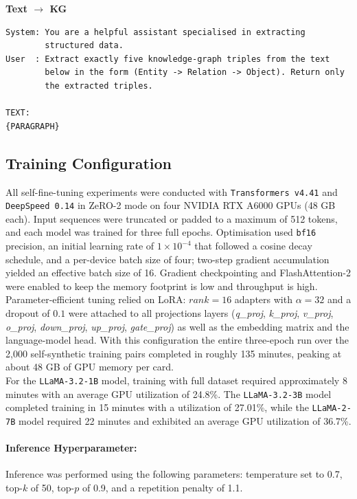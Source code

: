 \documentclass[11pt]{article}
\begin{document}
\noindent\textbf{Text $\rightarrow$ KG}
\begin{lstlisting}[style=prompt]
System: You are a helpful assistant specialised in extracting
        structured data.
User  : Extract exactly five knowledge-graph triples from the text
        below in the form (Entity -> Relation -> Object). Return only
        the extracted triples.

TEXT:
{PARAGRAPH}
\end{lstlisting}


\subsection{Training Configuration}
\label{ssec:training}

All self-fine-tuning experiments were conducted with
\texttt{Transformers v4.41} and \texttt{DeepSpeed 0.14} in ZeRO-2
mode on four NVIDIA RTX A6000 GPUs (48 GB each).
Input sequences were truncated or padded to a maximum of 512 tokens,
and each model was trained for three full epochs.
Optimisation used \texttt{bf16} precision, an initial learning rate of
\(1\times10^{-4}\) that followed a cosine decay schedule, and a
per-device batch size of four; two-step gradient accumulation yielded
an effective batch size of 16.
Gradient checkpointing and FlashAttention-2 were enabled to keep the
memory footprint is low and throughput is high.
Parameter-efficient tuning relied on LoRA: $rank=16$ adapters with
\(\alpha=32\) and a dropout of $0.1$ were attached to all projections
layers (\textit{q\_proj}, \textit{k\_proj}, \textit{v\_proj},
\textit{o\_proj}, \textit{down\_proj}, \textit{up\_proj},
\textit{gate\_proj}) as well as the embedding matrix and the language-model head.
With this configuration the entire three-epoch run over the 2,000
self-synthetic training pairs completed in roughly 135 minutes,
peaking at about 48 GB of GPU memory per card.\\
 For the \texttt{LLaMA-3.2-1B} model, training with full dataset required approximately 8 minutes with an average GPU utilization of 24.8\%. The \texttt{LLaMA-3.2-3B} model completed training in 15 minutes with a utilization of 27.01\%, while the \texttt{LLaMA-2-7B} model required 22 minutes and exhibited an average GPU utilization of 36.7\%. 
\paragraph{Inference Hyperparameter:}
Inference was performed using the following parameters: temperature set to 0.7, top-$k$ of 50, top-$p$ of 0.9, and a repetition penalty of 1.1.
\end{document}
